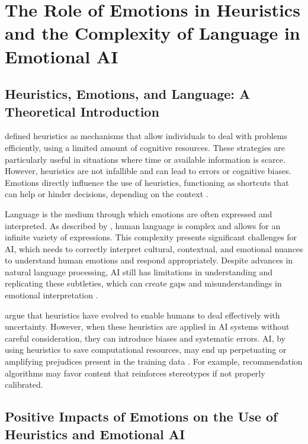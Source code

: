 \documentclass[a4paper,12pt]{report}
\begin{document}
	\section{The Role of Emotions in Heuristics and the Complexity of Language in Emotional AI}
	
	\subsection{Heuristics, Emotions, and Language: A Theoretical Introduction}
	
	\textcite{kahneman1974} defined heuristics as mechanisms that allow individuals to deal with problems efficiently, using a limited amount of cognitive resources. These strategies are particularly useful in situations where time or available information is scarce. However, heuristics are not infallible and can lead to errors or cognitive biases. Emotions directly influence the use of heuristics, functioning as shortcuts that can help or hinder decisions, depending on the context \parencite{slovic2007}.
	
	Language is the medium through which emotions are often expressed and interpreted. As described by \textcite{chomsky1965}, human language is complex and allows for an infinite variety of expressions. This complexity presents significant challenges for AI, which needs to correctly interpret cultural, contextual, and emotional nuances to understand human emotions and respond appropriately. Despite advances in natural language processing, AI still has limitations in understanding and replicating these subtleties, which can create gaps and misunderstandings in emotional interpretation \parencite{russell2020}.
	
	\textcite{gigerenzer2009} argue that heuristics have evolved to enable humans to deal effectively with uncertainty. However, when these heuristics are applied in AI systems without careful consideration, they can introduce biases and systematic errors. AI, by using heuristics to save computational resources, may end up perpetuating or amplifying prejudices present in the training data \parencite{bechara2000}. For example, recommendation algorithms may favor content that reinforces stereotypes if not properly calibrated.
	
	\subsection{Positive Impacts of Emotions on the Use of Heuristics and Emotional AI}
	
\end{document}
